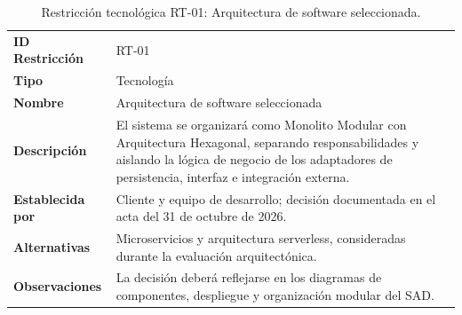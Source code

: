 \documentclass[11pt,a4paper,oneside]{article}
\begin{document}
\begingroup
\small
\setlength{\tabcolsep}{7pt}
\renewcommand{\arraystretch}{1.30}
\newlength{\anchoRegistro}
\setlength{\anchoRegistro}{\dimexpr\textwidth-4\tabcolsep-3\arrayrulewidth\relax}
\begin{table}[H]
\centering
\caption{Restricción tecnológica RT-01: Arquitectura de software seleccionada.}
\label{tab:restriccion-rt-01}
\begin{tabular}{|
>{\RaggedRight\arraybackslash}p{.28\anchoRegistro}|
>{\RaggedRight\arraybackslash}p{.72\anchoRegistro}|}
\hline
\rowcolor{negroTabla}
\multicolumn{2}{|l|}{\color{white}\bfseries Registro de Restricción Tecnológica}\\\hline
\cellcolor{azulTabla}\bfseries ID Restricción
& RT-01\\\hline
\cellcolor{azulTabla}\bfseries Tipo
& Tecnología\\\hline
\cellcolor{azulTabla}\bfseries Nombre
& Arquitectura de software seleccionada\\\hline
\cellcolor{azulTabla}\bfseries Descripción
& El sistema se organizará como Monolito Modular con Arquitectura Hexagonal, separando responsabilidades y aislando la lógica de negocio de los adaptadores de persistencia, interfaz e integración externa.\\\hline
\cellcolor{azulTabla}\bfseries Establecida por
& Cliente y equipo de desarrollo; decisión documentada en el acta del 31 de octubre de 2026.\\\hline
\cellcolor{azulTabla}\bfseries Alternativas
& Microservicios y arquitectura serverless, consideradas durante la evaluación arquitectónica.\\\hline
\cellcolor{azulTabla}\bfseries Observaciones
& La decisión deberá reflejarse en los diagramas de componentes, despliegue y organización modular del SAD.\\\hline
\end{tabular}
\end{table}
\endgroup
\end{document}
